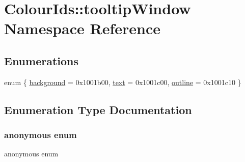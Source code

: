 \hypertarget{namespaceColourIds_1_1tooltipWindow}{}\section{Colour\+Ids\+:\+:tooltip\+Window Namespace Reference}
\label{namespaceColourIds_1_1tooltipWindow}
\subsection*{Enumerations}
\begin{DoxyCompactItemize}
\item 
enum \{ \mbox{\hyperlink{namespaceColourIds_1_1tooltipWindow_a9ec1f5e50e06a3f89f6efa9ad9109809ade78ce9af241cf9c007f45355b9f7cdb}{background}} = 0x1001b00, 
\mbox{\hyperlink{namespaceColourIds_1_1tooltipWindow_a9ec1f5e50e06a3f89f6efa9ad9109809a7affaf71036b10e37e7617ad481bc018}{text}} = 0x1001c00, 
\mbox{\hyperlink{namespaceColourIds_1_1tooltipWindow_a9ec1f5e50e06a3f89f6efa9ad9109809a9f871fbab47401b5cad56dadbfef81fa}{outline}} = 0x1001c10
 \}
\end{DoxyCompactItemize}


\subsection{Enumeration Type Documentation}
\mbox{\label{namespaceColourIds_1_1tooltipWindow_a9ec1f5e50e06a3f89f6efa9ad9109809}} 
\subsubsection{\texorpdfstring{anonymous enum}{anonymous enum}}
{\footnotesize\ttfamily anonymous enum}

